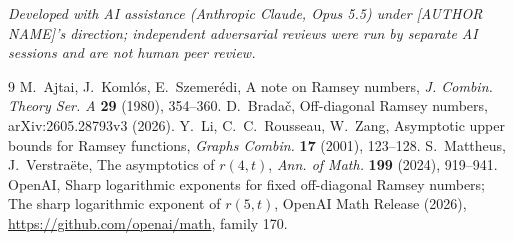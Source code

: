 \documentclass[11pt]{amsart}
\theoremstyle{remark}
\begin{document}
\medskip\noindent\emph{Developed with AI assistance (Anthropic Claude,
Opus 5.5) under [AUTHOR NAME]'s direction; independent adversarial reviews
were run by separate AI sessions and are not human peer review.}

\begin{thebibliography}{9}
 M.~Ajtai, J.~Koml\'os, E.~Szemer\'edi, A note on Ramsey
numbers, \emph{J. Combin. Theory Ser. A} \textbf{29} (1980), 354--360.
 D.~Brada\v{c}, Off-diagonal Ramsey numbers,
arXiv:2605.28793v3 (2026).
 Y.~Li, C.~C.~Rousseau, W.~Zang, Asymptotic upper bounds for
Ramsey functions, \emph{Graphs Combin.} \textbf{17} (2001), 123--128.
 S.~Mattheus, J.~Verstra\"ete, The asymptotics of $r(4,t)$,
\emph{Ann. of Math.} \textbf{199} (2024), 919--941.
 OpenAI, Sharp logarithmic exponents for fixed
off-diagonal Ramsey numbers; The sharp logarithmic exponent of $r(5,t)$,
OpenAI Math Release (2026), \url{https://github.com/openai/math}, family 170.
\end{thebibliography}
\end{document}
